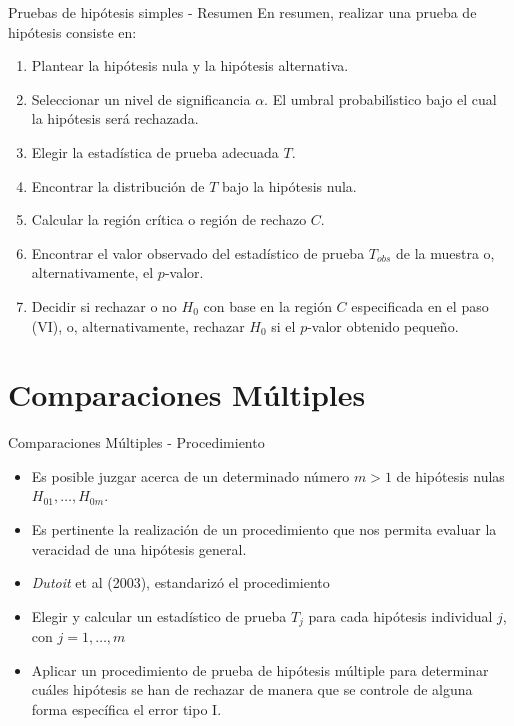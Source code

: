 \begin{frame}{Pruebas de hipótesis simples - Resumen}
En resumen, realizar una prueba de hipótesis consiste en:
\begin{enumerate}[<+- | alert@+>][I]
    \item Plantear la hipótesis nula y la hipótesis alternativa.
	\item Seleccionar un nivel de significancia $\alpha$. El umbral probabilı́stico bajo el cual la hipótesis será rechazada.
	\item Elegir la estadística de prueba adecuada $T$.
	\item Encontrar la distribución de $T$ bajo la hipótesis nula.
	\item Calcular la región crítica o región de rechazo $C$.
	\item Encontrar el valor observado del estadístico de prueba $T_{obs}$ de la muestra o, alternativamente, el $p$-valor.
	\item Decidir si rechazar o no $H_0$ con base en la región $C$ especificada en el paso (VI), o, alternativamente, rechazar $H_0$ si el $p$-valor obtenido pequeño.
\end{enumerate}
\end{frame}

\section{Comparaciones Múltiples}

\begin{frame}{Comparaciones Múltiples - Procedimiento}
\begin{itemize}[<+- | alert@+>]
    \item Es posible juzgar acerca de un determinado número $m>1$ de hipótesis nulas $H_{01},\dots,H_{0m}$.
	\item Es pertinente la realización de un procedimiento que nos permita evaluar la veracidad de una hipótesis general.
	\item \textit{Dutoit} et al (2003), estandarizó el procedimiento
	\item Elegir y calcular un estadístico de prueba $T_j$ para cada hipótesis individual $j$, con $j=1,\dots,m$
	\item Aplicar un procedimiento de prueba de hipótesis múltiple para determinar cuáles hipótesis se han
	de rechazar de manera que se controle de alguna forma específica el error tipo I.
\end{itemize}
\end{frame}


